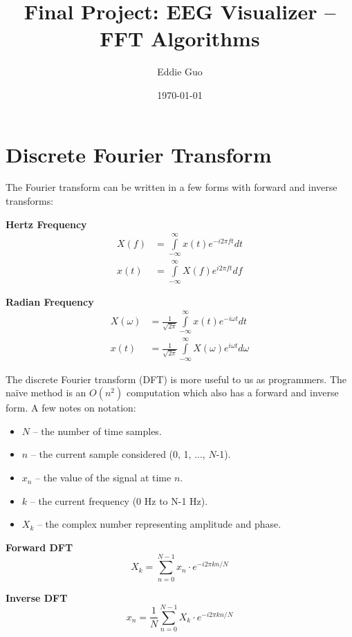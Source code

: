\documentclass{article}
\title{\Large \textbf{Final Project: EEG Visualizer -- FFT Algorithms}}
\author{Eddie Guo}
\date{\today}
\begin{document}
\maketitle
\thispagestyle{fancy}

\section*{Discrete Fourier Transform}
The Fourier transform can be written in a few forms with forward and inverse transforms:

\begin{multicols}{2}
    \textbf{Hertz Frequency}
    \begin{align*}
        X(f) &= \int\limits_{-\infty}^{\infty} x(t) e^{-i 2\pi ft} dt\\
        x(t) &= \int\limits_{-\infty}^{\infty} X(f) e^{i 2\pi ft} df
    \end{align*}

    \textbf{Radian Frequency}
    \begin{align*}
        X(\omega) &= \frac{1}{\sqrt{2\pi}} \int\limits_{-\infty}^{\infty} x(t) e^{-i \omega t} dt\\
        x(t) &= \frac{1}{\sqrt{2\pi}} \int\limits_{-\infty}^{\infty} X(\omega) e^{i \omega t} d\omega
    \end{align*}
\end{multicols}

The discrete Fourier transform (DFT) is more useful to us as programmers. The na\"{i}ve method is an $O(n^2)$ computation which also has a forward and inverse form. A few notes on notation:

\begin{multicols}{2}
    \begin{itemize}
        \item $N$ -- the number of time samples.
        \item $n$ -- the current sample considered (0, 1, ..., $N$-1).
        \item $x_n$ -- the value of the signal at time $n$.
        \item $k$ -- the current frequency (0 Hz to N-1 Hz).
        \item $X_k$ -- the complex number representing amplitude and phase.
    \end{itemize}
\end{multicols}
\textbf{Forward DFT} $$ X_k = \sum_{n=0}^{N-1} x_n \cdot e^{-i 2 \pi k n / N} $$

\textbf{Inverse DFT} $$ x_n = \frac{1}{N} \sum_{n=0}^{N-1} X_k \cdot e^{-i 2 \pi k n / N} $$
\end{document}
